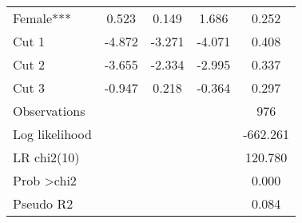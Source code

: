 \begin{table}[H]
\begin{tabular}{lcccc}
Female***                    & 0.523       & 0.149     & 1.686      & 0.252     \\
Cut 1                        & -4.872      & -3.271    & -4.071     & 0.408     \\
Cut 2                        & -3.655      & -2.334    & -2.995     & 0.337     \\
Cut 3                        & -0.947      & 0.218     & -0.364     & 0.297     \\
\midrule
Observations                 &             &           &            & 976       \\
Log likelihood               &             &           &            & -662.261  \\
LR chi2(10)                  &             &           &            & 120.780   \\
Prob \textgreater chi2       &             &           &            & 0.000     \\
Pseudo R2                    &             &           &            & 0.084     \\
\bottomrule
\end{tabular}
\end{table}


